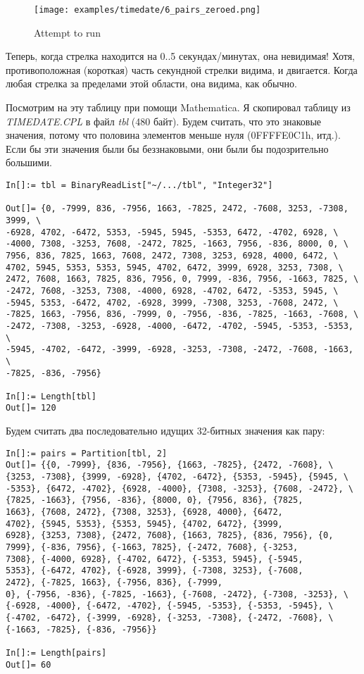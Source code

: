 \begin{figure}[H]
\centering
\texttt{[image: examples/timedate/6\_pairs\_zeroed.png]}
\caption{Attempt to run}
\end{figure}

Теперь, когда стрелка находится на 0..5 секундах/минутах, она невидимая! Хотя, противоположная (короткая) часть секундной
стрелки видима, и двигается.
Когда любая стрелка за пределами этой области, она видима, как обычно.

Посмотрим на эту таблицу при помощи Mathematica.
Я скопировал таблицу из \emph{TIMEDATE.CPL} в файл \emph{tbl} (480 байт).
Будем считать, что это знаковые значения, потому что половина элементов меньше нуля (0FFFFE0C1h, итд.).
Если бы эти значения были бы беззнаковыми, они были бы подозрительно большими.

\begin{lstlisting}[style=custommath]
In[]:= tbl = BinaryReadList["~/.../tbl", "Integer32"]

Out[]= {0, -7999, 836, -7956, 1663, -7825, 2472, -7608, 3253, -7308, 3999, \
-6928, 4702, -6472, 5353, -5945, 5945, -5353, 6472, -4702, 6928, \
-4000, 7308, -3253, 7608, -2472, 7825, -1663, 7956, -836, 8000, 0, \
7956, 836, 7825, 1663, 7608, 2472, 7308, 3253, 6928, 4000, 6472, \
4702, 5945, 5353, 5353, 5945, 4702, 6472, 3999, 6928, 3253, 7308, \
2472, 7608, 1663, 7825, 836, 7956, 0, 7999, -836, 7956, -1663, 7825, \
-2472, 7608, -3253, 7308, -4000, 6928, -4702, 6472, -5353, 5945, \
-5945, 5353, -6472, 4702, -6928, 3999, -7308, 3253, -7608, 2472, \
-7825, 1663, -7956, 836, -7999, 0, -7956, -836, -7825, -1663, -7608, \
-2472, -7308, -3253, -6928, -4000, -6472, -4702, -5945, -5353, -5353, \
-5945, -4702, -6472, -3999, -6928, -3253, -7308, -2472, -7608, -1663, \
-7825, -836, -7956}

In[]:= Length[tbl]
Out[]= 120
\end{lstlisting}

Будем считать два последовательно идущих 32-битных значения как пару:

\begin{lstlisting}[style=custommath]
In[]:= pairs = Partition[tbl, 2]
Out[]= {{0, -7999}, {836, -7956}, {1663, -7825}, {2472, -7608}, \
{3253, -7308}, {3999, -6928}, {4702, -6472}, {5353, -5945}, {5945, \
-5353}, {6472, -4702}, {6928, -4000}, {7308, -3253}, {7608, -2472}, \
{7825, -1663}, {7956, -836}, {8000, 0}, {7956, 836}, {7825, 
1663}, {7608, 2472}, {7308, 3253}, {6928, 4000}, {6472, 
4702}, {5945, 5353}, {5353, 5945}, {4702, 6472}, {3999, 
6928}, {3253, 7308}, {2472, 7608}, {1663, 7825}, {836, 7956}, {0, 
7999}, {-836, 7956}, {-1663, 7825}, {-2472, 7608}, {-3253, 
7308}, {-4000, 6928}, {-4702, 6472}, {-5353, 5945}, {-5945, 
5353}, {-6472, 4702}, {-6928, 3999}, {-7308, 3253}, {-7608, 
2472}, {-7825, 1663}, {-7956, 836}, {-7999, 
0}, {-7956, -836}, {-7825, -1663}, {-7608, -2472}, {-7308, -3253}, \
{-6928, -4000}, {-6472, -4702}, {-5945, -5353}, {-5353, -5945}, \
{-4702, -6472}, {-3999, -6928}, {-3253, -7308}, {-2472, -7608}, \
{-1663, -7825}, {-836, -7956}}

In[]:= Length[pairs]
Out[]= 60
\end{lstlisting}

